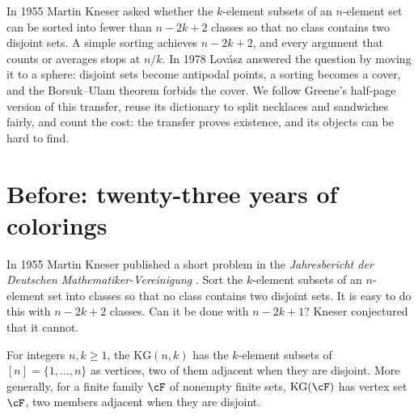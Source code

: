 \begin{refsection}

\newcommand{\kneserKG}{\mathrm{KG}}
\newcommand{\kneserSG}{\mathrm{SG}}
\newcommand{\kneserCd}{\mathrm{cd}_2}

\begin{chaptersummary}
In 1955 Martin Kneser asked whether the $k$-element subsets of an $n$-element set can be sorted into fewer than $n-2k+2$ classes so that no class contains two disjoint sets. A simple sorting achieves $n-2k+2$, and every argument that counts or averages stops at $n/k$. In 1978 Lov\'asz answered the question by moving it to a sphere: disjoint sets become antipodal points, a sorting becomes a cover, and the Borsuk--Ulam theorem forbids the cover. We follow Greene's half-page version of this transfer, reuse its dictionary to split necklaces and sandwiches fairly, and count the cost: the transfer proves existence, and its objects can be hard to find.
\end{chaptersummary}

\section{Before: twenty-three years of colorings}\label{sec:kneser:before}

In 1955 Martin Kneser published a short problem in the \emph{Jahresbericht der Deutschen Mathematiker-Vereinigung} \parencite{Kneser1955}. Sort the $k$-element subsets of an $n$-element set into classes so that no class contains two disjoint sets. It is easy to do this with $n-2k+2$ classes. Can it be done with $n-2k+1$? Kneser conjectured that it cannot.

\begin{definition}\label{def:kneser:kg}
For integers $n,k\ge1$, the  $\kneserKG(n,k)$ has the $k$-element subsets of $[n]=\{1,\dots,n\}$ as vertices, two of them adjacent when they are disjoint. More generally, for a finite family $\cF$ of nonempty finite sets, $\kneserKG(\cF)$ has vertex set $\cF$, two members adjacent when they are disjoint.
\end{definition}


\end{refsection}

